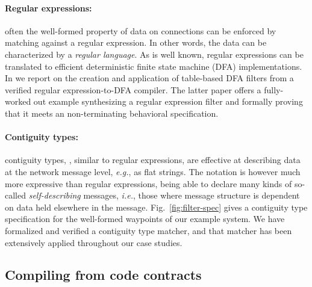 \documentclass[global,twocolumn]{svjour}
\newcommand{\figref}[1]{Fig.~\ref{#1}}
\newcommand{\ie}{\textit{i.e.}}
\newcommand{\eg}{\textit{e.g.}}
\begin{document}
\paragraph{Regular expressions:\/} often the well-formed property of data on connections can be enforced by matching against a regular expression.
%
In other words, the data can be characterized by a \emph{regular language}.
%
As is well known, regular expressions can be translated to efficient deterministic finite state machine (DFA) implementations.
%
In \cite{formal-filter-synth-langsec,case-verified-filter} we report on the creation and application of table-based DFA filters from a verified regular expression-to-DFA compiler.
%
The latter paper offers a fully-worked out example synthesizing a regular expression filter and formally proving that it meets an non-terminating behavioral specification.

\paragraph{Contiguity types:\/} contiguity types, \cite{contiguity-types}, similar to regular expressions, are effective at describing data at the network message level, \eg, as flat strings.
%
The notation is however much more expressive than regular expressions, being able to declare many kinds of so-called \emph{self-describing} messages, \ie, those where message structure is dependent on data held elsewhere in the message.
%
\figref{fig:filter-spec} gives a contiguity type specification for the well-formed waypoints of our example system.
%
We have formalized and verified a contiguity type matcher, and that matcher has been extensively applied throughout our case studies.


\subsection{Compiling from code contracts}
\end{document}
